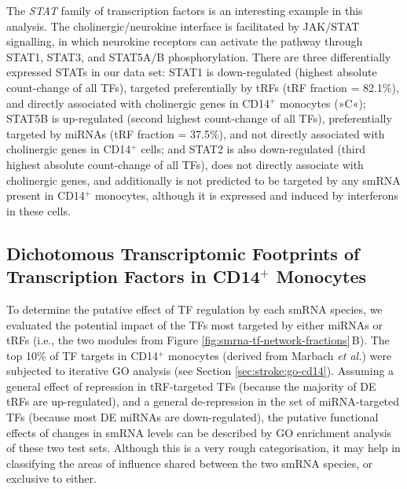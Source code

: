The \emph{STAT} family of transcription factors is an interesting example in this analysis. The cholinergic/neurokine interface is facilitated by JAK/STAT signalling, in which neurokine receptors can activate the pathway through STAT1, STAT3, and STAT5A/B phosphorylation.\cite{Lobentanzer2019a} There are three differentially expressed STATs in our data set: STAT1 is down-regulated (highest absolute count-change of all TFs), targeted preferentially by tRFs (tRF fraction = 82.1\%), and directly associated with cholinergic genes in CD14$^+$ monocytes (»C«); STAT5B is up-regulated (second highest count-change of all TFs), preferentially targeted by miRNAs (tRF fraction = 37.5\%), and not directly associated with cholinergic genes in CD14$^+$ cells; and STAT2 is also down-regulated (third highest absolute count-change of all TFs), does not directly associate with cholinergic genes, and additionally is not predicted to be targeted by any smRNA present in CD14$^+$ monocytes, although it is expressed and induced by interferons in these cells.\cite{Lehtonen1997} 

\subsection{Dichotomous Transcriptomic Footprints of \\Transcription Factors in CD14$^+$ Monocytes}
To determine the putative effect of TF regulation by each smRNA species, we evaluated the potential impact of the TFs most targeted by either miRNAs or tRFs (i.e., the two modules from Figure \ref{fig:smrna-tf-network-fractions}\,B). The top 10\% of TF targets in CD14$^+$ monocytes (derived from Marbach \emph{et al.}\cite{Marbach2016}) were subjected to iterative GO analysis (see Section \ref{sec:stroke:go-cd14}). Assuming a general effect of repression in tRF-targeted TFs (because the majority of DE tRFs are up-regulated), and a general de-repression in the set of miRNA-targeted TFs (because most DE miRNAs are down-regulated), the putative functional effects of changes in smRNA levels can be described by GO enrichment analysis of these two test sets. Although this is a very rough categorisation, it may help in classifying the areas of influence shared between the two smRNA species, or exclusive to either.

